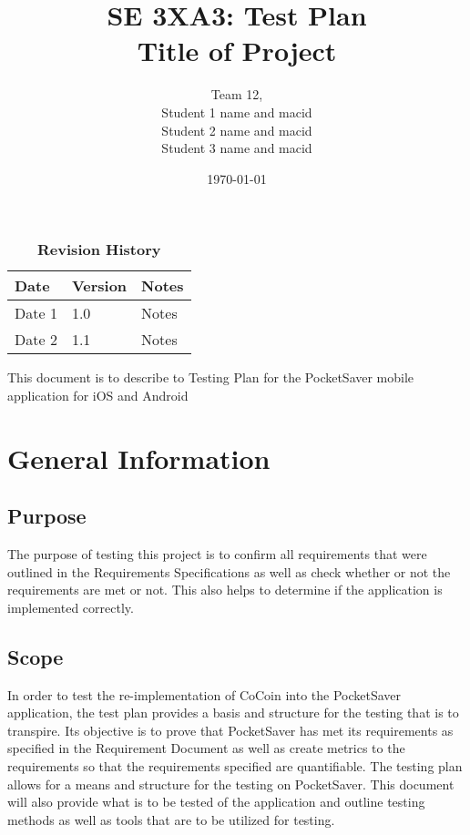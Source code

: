 \documentclass[12pt, titlepage]{article}
\title{SE 3XA3: Test Plan\\Title of Project}
\author{Team 12, 
		\\ Student 1 name and macid
		\\ Student 2 name and macid
		\\ Student 3 name and macid
}
\date{\today}
\begin{document}
\maketitle

\tableofcontents
\listoftables
\listoffigures

\begin{table}[bp]
\caption{\bf Revision History}
\begin{tabularx}{\textwidth}{p{3cm}p{2cm}X}
\toprule {\bf Date} & {\bf Version} & {\bf Notes}\\
\midrule
Date 1 & 1.0 & Notes\\
Date 2 & 1.1 & Notes\\
\bottomrule
\end{tabularx}
\end{table}

\newpage


This document is to describe to Testing Plan for the PocketSaver mobile application for iOS and Android

\section{General Information}

\subsection{Purpose}
The purpose of testing this project is to confirm all requirements that were outlined in the Requirements Specifications as well as check whether or not the requirements are met or not. This also helps to determine if the application is implemented correctly.

\subsection{Scope}
In order to test the re-implementation of CoCoin into the PocketSaver application, the test plan provides a basis and structure for the testing that is to transpire. Its objective is to prove that PocketSaver has met its requirements as specified in the Requirement Document as well as create metrics to the requirements so that the requirements specified are quantifiable. The testing plan allows for a means and structure for the testing on PocketSaver. This document will also provide what is to be tested of the application and outline testing methods as well as tools that are to be utilized for testing.
\end{document}
